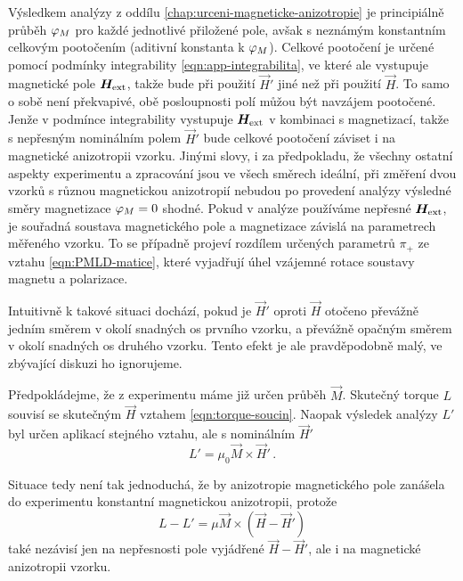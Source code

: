 Výsledkem analýzy z oddílu \ref{chap:urceni-magneticke-anizotropie} je principiálně průběh $\varphi_M$ pro každé jednotlivé přiložené pole, avšak s neznámým konstantním celkovým pootočením (aditivní konstanta k $\varphi_M$).
Celkové pootočení je určené pomocí podmínky integrability \eqref{eqn:app-integrabilita}, ve které ale vystupuje magnetické pole $\bm{H}_\textrm{ext}$, takže bude při použití $\vec{H}'$ jiné než při použití $\vec{H}$.
To samo o sobě není překvapivé, obě posloupnosti polí můžou být navzájem pootočené.
Jenže v podmínce integrability vystupuje $\bm{H}_\textrm{ext}$ v kombinaci s magnetizací, takže s nepřesným nominálním polem $\vec{H}'$ bude celkové pootočení záviset i na magnetické anizotropii vzorku.
Jinými slovy, i za předpokladu, že všechny ostatní aspekty experimentu a zpracování jsou ve všech směrech ideální, při změření dvou vzorků s různou magnetickou anizotropií nebudou po provedení analýzy výsledné směry magnetizace $\varphi_M=0$ shodné.
Pokud v analýze používáme nepřesné $\bm{H}_\textrm{ext}$, je souřadná soustava magnetického pole a magnetizace závislá na parametrech měřeného vzorku.
To se případně projeví rozdílem určených parametrů $\pi_+$ ze vztahu \eqref{eqn:PMLD-matice}, které vyjadřují úhel vzájemné rotace soustavy magnetu a polarizace.

Intuitivně k takové situaci dochází, pokud je $\vec{H}'$ oproti $\vec{H}$ otočeno převážně jedním směrem v okolí snadných os prvního vzorku, a převážně opačným směrem v okolí snadných os druhého vzorku.
Tento efekt je ale pravděpodobně malý, ve zbývající diskuzi ho ignorujeme.

Předpokládejme, že z experimentu máme již určen průběh $\vec{M}$.
Skutečný torque $L$ souvisí se skutečným $\vec{H}$ vztahem \eqref{eqn:torque-soucin}.
Naopak výsledek analýzy $L'$ byl určen aplikací stejného vztahu, ale s nominálním $\vec{H}'$
\begin{equation}
    L' = \mu_0 \vec{M}\times\vec{H}' \,.
\end{equation}

Situace tedy není tak jednoduchá, že by anizotropie magnetického pole zanášela do experimentu konstantní magnetickou anizotropii, protože
\begin{equation}
    \label{eqn:pridana-anizotropie}
L -L' = \mu \vec{M} \times (\vec{H}-\vec{H}')
\end{equation}
také nezávisí jen na nepřesnosti pole vyjádřené $\vec{H}-\vec{H}'$, ale i na magnetické anizotropii vzorku.

